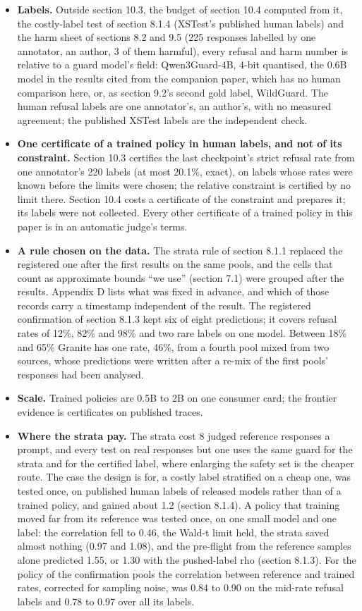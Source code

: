 \documentclass[11pt]{article}
\begin{document}
\begin{itemize}
\item \textbf{Labels.} Outside section 10.3, the budget of section 10.4 computed from it, the costly-label test of section 8.1.4 (XSTest's published human labels) and the harm sheet of sections 8.2 and 9.5 (225 responses labelled by one annotator, an author, 3 of them harmful), every refusal and harm number is relative to a guard model's field: Qwen3Guard-4B, 4-bit quantised, the 0.6B model in the results cited from the companion paper, which has no human comparison here, or, as section 9.2's second gold label, WildGuard. The human refusal labels are one annotator's, an author's, with no measured agreement; the published XSTest labels are the independent check.
\item \textbf{One certificate of a trained policy in human labels, and not of its constraint.} Section 10.3 certifies the last checkpoint's strict refusal rate from one annotator's 220 labels (at most 20.1\%, exact), on labels whose rates were known before the limits were chosen; the relative constraint is certified by no limit there. Section 10.4 costs a certificate of the constraint and prepares it; its labels were not collected. Every other certificate of a trained policy in this paper is in an automatic judge's terms.
\item \textbf{A rule chosen on the data.} The strata rule of section 8.1.1 replaced the registered one after the first results on the same pools, and the cells that count as approximate bounds ``we use'' (section 7.1) were grouped after the results. Appendix D lists what was fixed in advance, and which of those records carry a timestamp independent of the result. The registered confirmation of section 8.1.3 kept six of eight predictions; it covers refusal rates of 12\%, 82\% and 98\% and two rare labels on one model. Between 18\% and 65\% Granite has one rate, 46\%, from a fourth pool mixed from two sources, whose predictions were written after a re-mix of the first pools' responses had been analysed.
\item \textbf{Scale.} Trained policies are 0.5B to 2B on one consumer card; the frontier evidence is certificates on published traces.
\item \textbf{Where the strata pay.} The strata cost 8 judged reference responses a prompt, and every test on real responses but one uses the same guard for the strata and for the certified label, where enlarging the safety set is the cheaper route. The case the design is for, a costly label stratified on a cheap one, was tested once, on published human labels of released models rather than of a trained policy, and gained about 1.2 (section 8.1.4). A policy that training moved far from its reference was tested once, on one small model and one label: the correlation fell to 0.46, the Wald-t limit held, the strata saved almost nothing (0.97 and 1.08), and the pre-flight from the reference samples alone predicted 1.55, or 1.30 with the pushed-label rho (section 8.1.3). For the policy of the confirmation pools the correlation between reference and trained rates, corrected for sampling noise, was 0.84 to 0.90 on the mid-rate refusal labels and 0.78 to 0.97 over all its labels.

\end{itemize}
\end{document}
